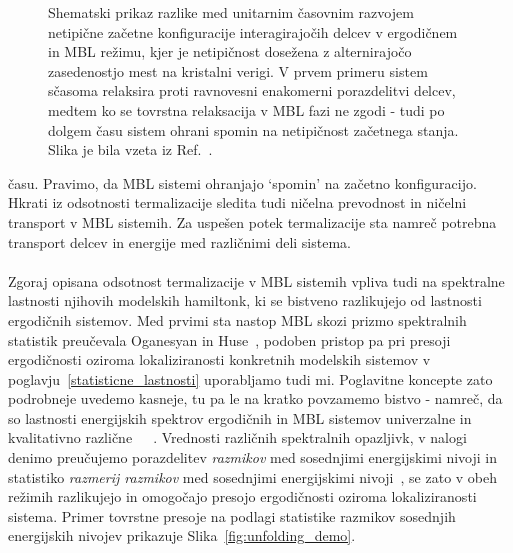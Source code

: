 \begin{minipage}[t]{0.53\textwidth}
\begin{figure}[H]
\caption{
Shematski prikaz razlike med unitarnim časovnim razvojem netipične začetne konfiguracije interagirajočih delcev v ergodičnem in MBL režimu, kjer je netipičnost dosežena z alternirajočo zasedenostjo mest na kristalni verigi.
 V prvem primeru sistem sčasoma relaksira proti ravnovesni enakomerni porazdelitvi delcev, medtem ko se tovrstna relaksacija v MBL fazi ne zgodi - tudi po dolgem času sistem ohrani spomin na netipičnost začetnega stanja. Slika je bila vzeta iz Ref.~\cite{abanin2018ergodicity}. 
}
\label{fig:abanin_thermalization}
\end{figure}
\end{minipage}
  času. Pravimo, da MBL sistemi ohranjajo `spomin' na začetno konfiguracijo. Hkrati iz odsotnosti termalizacije sledita tudi ničelna prevodnost in ničelni transport v MBL sistemih. Za uspešen potek termalizacije sta namreč potrebna transport delcev in energije med različnimi deli sistema. \\\\
Zgoraj opisana odsotnost termalizacije v MBL sistemih vpliva tudi na spektralne lastnosti njihovih modelskih hamiltonk, ki se bistveno razlikujejo od lastnosti ergodičnih sistemov. Med prvimi sta nastop MBL skozi prizmo spektralnih statistik preučevala Oganesyan in Huse~\cite{PhysRevB.75.155111}, podoben pristop pa pri presoji ergodičnosti oziroma lokaliziranosti konkretnih modelskih sistemov v poglavju~\ref{statisticne_lastnosti} uporabljamo tudi mi. Poglavitne koncepte zato podrobneje uvedemo kasneje, tu pa le na kratko povzamemo bistvo - namreč, da so lastnosti energijskih spektrov ergodičnih in MBL sistemov univerzalne in kvalitativno različne~\cite{mehta2004random}~\cite{Atas_Distribution_PhysRevLett.110.084101}~\cite{d2016quantum}. Vrednosti različnih spektralnih opazljivk, v nalogi denimo preučujemo porazdelitev \emph{razmikov} med sosednjimi energijskimi nivoji in statistiko \emph{razmerij razmikov} med sosednjimi energijskimi nivoji~\cite{PhysRevB.75.155111}, se zato v obeh režimih razlikujejo in omogočajo presojo ergodičnosti oziroma lokaliziranosti sistema. Primer tovrstne presoje na podlagi statistike razmikov sosednjih energijskih nivojev prikazuje Slika~\ref{fig:unfolding_demo}.
